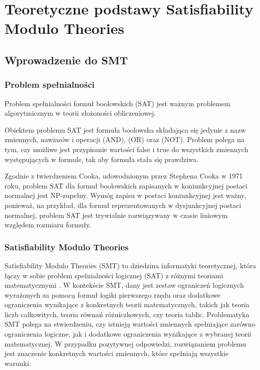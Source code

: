 \chapter{Teoretyczne podstawy Satisfiability Modulo Theories}

\section{Wprowadzenie do SMT}

\subsection{Problem spełnialności}
Problem spełnialności formuł boolowskich (SAT) jest ważnym problemem algorytmicznym w teorii złożoności obliczeniowej.

Obiektem problemu SAT jest formuła boolowska składająca się jedynie z nazw zmiennych, nawiasów i operacji 
{\wedge} (AND), {\vee} (OR) oraz {\neg} (NOT). Problem polega na tym, czy możliwe jest przypisanie wartości false i true do wszystkich zmiennych występujących w formule, tak aby formuła stała się prawdziwa.

Zgodnie z twierdzeniem Cooka, udowodnionym przez Stephena Cooka w 1971 roku, problem SAT dla formuł boolowskich zapisanych w koniunkcyjnej postaci normalnej jest NP-zupełny. Wymóg zapisu w postaci koniunkcyjnej jest ważny, ponieważ, na przykład, dla formuł reprezentowanych w dysjunkcyjnej postaci normalnej, problem SAT jest trywialnie rozwiązywany w czasie liniowym względem rozmiaru formuły.

\subsection{Satisfiability Modulo Theories}
Satisfiability Modulo Theories (SMT) to dziedzina informatyki teoretycznej, która łączy w sobie problem spełnialności logicznej (SAT) z różnymi teoriami matematycznymi \cite{MouraB11}. 
W kontekście SMT, dany jest zestaw ograniczeń logicznych wyrażonych za pomocą formuł logiki pierwszego rzędu oraz dodatkowe ograniczenia wynikające z konkretnych teorii matematycznych, takich jak teoria liczb całkowitych, teoria równań różniczkowych, czy teoria tablic.
Problematyka SMT polega na stwierdzeniu, czy istnieją wartości zmiennych spełniające zarówno ograniczenia logiczne, jak i dodatkowe ograniczenia wynikające z wybranej teorii matematycznej. W przypadku pozytywnej odpowiedzi, rozwiązaniem problemu jest znaczenie konkretnych wartości zmiennych, które spełniają wszystkie warunki.
	
